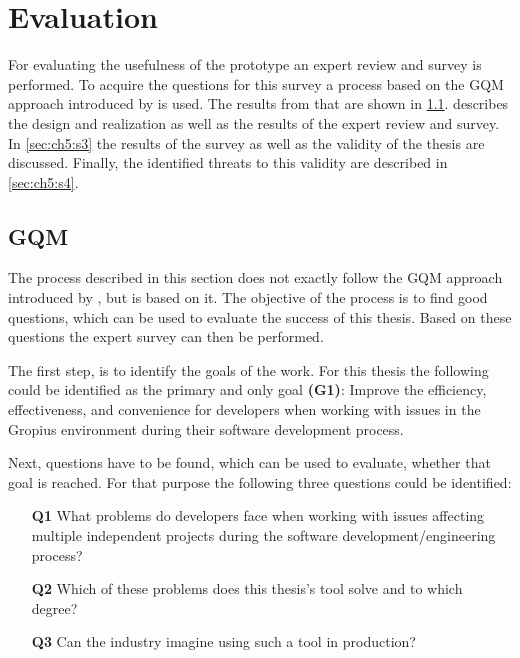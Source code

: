 
\chapter{Evaluation}
\label{chap:ch5}
For evaluating the usefulness of the prototype an expert review and survey is performed.
To acquire the questions for this survey a process based on the \gls{GQM} approach introduced by \cite{caldiera1994goal} is used.
The results from that are shown in \cref{sec:ch5:s1}.
 describes the design and realization as well as the results of the expert review and survey.
In \cref{sec:ch5:s3} the results of the survey as well as the validity of the thesis are discussed.
Finally, the identified threats to this validity are described in \cref{sec:ch5:s4}.

\section{GQM}
\label{sec:ch5:s1}
The process described in this section does not exactly follow the \gls{GQM} approach introduced by \cite{caldiera1994goal},
but is based on it.
The objective of the process is to find good questions, which can be used to evaluate the success of this thesis.
Based on these questions the expert survey can then be performed.

The first step, is to identify the goals of the work.
For this thesis the following could be identified as the primary and only goal \textbf{(G1)}:
Improve the efficiency, effectiveness, and convenience for developers when working with issues in the Gropius environment during their software development process. 

Next, questions have to be found, which can be used to evaluate, whether that goal is reached.
For that purpose the following three questions could be identified:
\begin{itemize}
	\item[\textbf{Q1}] What problems do developers face when working with issues affecting multiple independent projects during the software development/engineering process?
	\item[\textbf{Q2}] Which of these problems does this thesis's tool solve and to which degree?
	\item[\textbf{Q3}] Can the industry imagine using such a tool in production?
\end{itemize}

